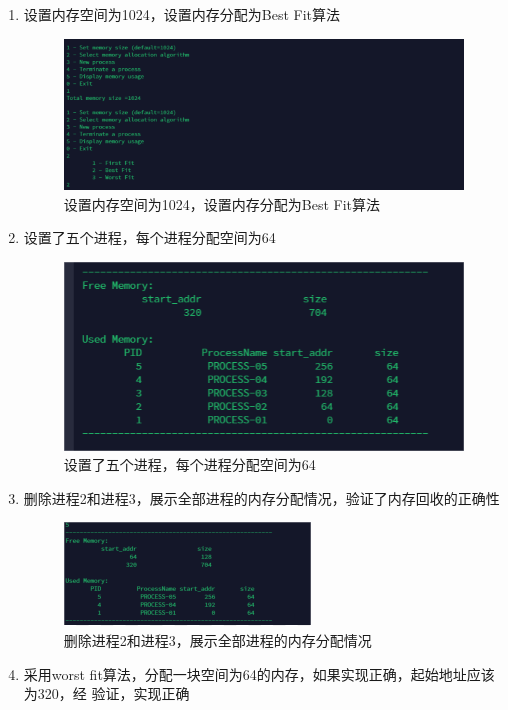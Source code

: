 \documentclass{article}
\begin{document}
    \begin{enumerate}
        \item  设置内存空间为1024，设置内存分配为Best Fit算法

        
        \begin{figure}[htbp]
            \centering
            \includegraphics[scale=0.7]{picture/17.png}
            \caption{设置内存空间为1024，设置内存分配为Best Fit算法}
            \label{17}
        \end{figure}
        \item 设置了五个进程，每个进程分配空间为64
        \begin{figure}[htbp]
            \centering
            \includegraphics[scale=0.55]{picture/18.png}
            \caption{设置了五个进程，每个进程分配空间为64}
            \label{18}
        \end{figure}
        \item  删除进程2和进程3，展示全部进程的内存分配情况，验证了内存回收的正确性
        \begin{figure}[htbp]
            \centering
            \includegraphics[scale=1.2]{picture/19.png}
            \caption{删除进程2和进程3，展示全部进程的内存分配情况}
            \label{19}
        \end{figure}
        \item 采用worst fit算法，分配一块空间为64的内存，如果实现正确，起始地址应该为320，经
        验证，实现正确


\end{enumerate}
\end{document}
